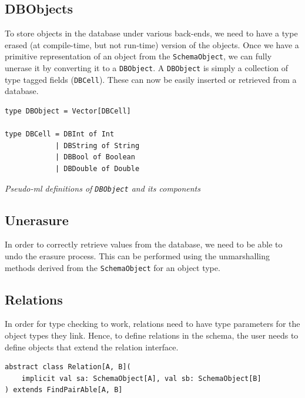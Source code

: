 \documentclass[12pt,a4paper,twoside,openright]{report}
\newcommand\codeName[1]{\texttt{#1}}
\newcommand\note[1]{\textit{#1}}
\renewcommand{\baselinestretch}{1.1}    %
\begin{document}
	\subsection{DBObjects}
	
	To store objects in the database under various back-ends, we need to have a type erased (at compile-time, but not run-time) version of the objects. Once we have a primitive representation of an object from the \codeName{SchemaObject}, we can fully unerase it by converting it to a \codeName{DBObject}. A \codeName{DBObject} is simply a collection of type tagged fields (\codeName{DBCell}). These can now be easily inserted or retrieved from a database.
	
\renewcommand{\baselinestretch}{0.8}
\begin{framed}
	\begin{verbatim}
type DBObject = Vector[DBCell]

type DBCell = DBInt of Int 
			| DBString of String
			| DBBool of Boolean
			| DBDouble of Double
	\end{verbatim}
	
	\note{Pseudo-ml definitions of \codeName{DBObject} and its components}
\end{framed}
\renewcommand{\baselinestretch}{0.8}
	
	\subsection{Unerasure}
	In order to correctly retrieve values from the database, we need to be able to undo the erasure process. This can be performed using the unmarshalling methods derived from the \codeName{SchemaObject}  for an object type.
	\subsection{Relations}
	    In order for type checking to work, relations need to have type parameters for the object types they link. Hence, to define relations in the schema, the user needs to define objects that extend the relation interface.
	    
\renewcommand{\baselinestretch}{0.8}
\begin{framed}
\begin{verbatim}
abstract class Relation[A, B](
    implicit val sa: SchemaObject[A], val sb: SchemaObject[B]
) extends FindPairAble[A, B]
\end{verbatim}
\end{framed}
\renewcommand{\baselinestretch}{1.1}
\end{document}
